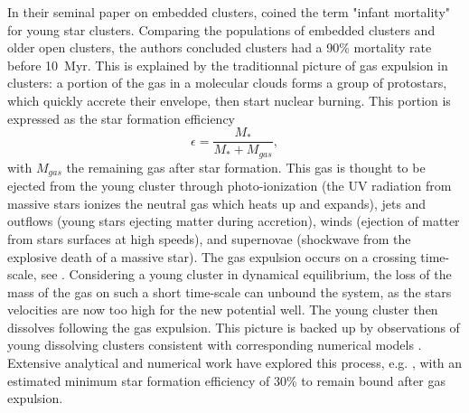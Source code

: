 In their seminal paper on embedded clusters, \cite{Lada2003} coined the term "infant mortality" for young star clusters. Comparing the populations of embedded clusters and older open clusters, the authors concluded clusters had a 90\% mortality rate before 10~Myr. This is explained by the traditionnal picture of gas expulsion in clusters: a portion of the gas in a molecular clouds forms a group of protostars, which quickly accrete their envelope, then start nuclear burning. This portion is expressed as the star formation efficiency
\begin{equation}
\epsilon = \frac{M_*}{M_* + M_{gas}},
\end{equation} 
with $M_{gas}$ the remaining gas after star formation. This gas is thought to be ejected from the young cluster through photo-ionization (the UV radiation from massive stars ionizes the neutral gas which heats up and expands), jets and outflows (young stars ejecting matter during accretion), winds (ejection of matter from stars surfaces at high speeds), and supernovae (shockwave from the explosive death of a massive star). The gas expulsion occurs on a crossing time-scale, see \cite{Krause2016}. Considering a young cluster in dynamical equilibrium, the loss of the mass of the gas on such a short time-scale can unbound the system, as the stars velocities are now too high for the new potential well. The young cluster then dissolves following the gas expulsion.
This picture is backed up by observations of young dissolving clusters \citep{Bastian2006} consistent with corresponding numerical models \citep{Goodwin2006}. Extensive analytical and numerical work have explored this process, e.g. \cite{Tutukov1978,Hills1980,Lada1984,Adams2000,Boily2003a,Boily2003b}, with an estimated minimum star formation efficiency of 30\% to remain bound after gas expulsion.
%
%
